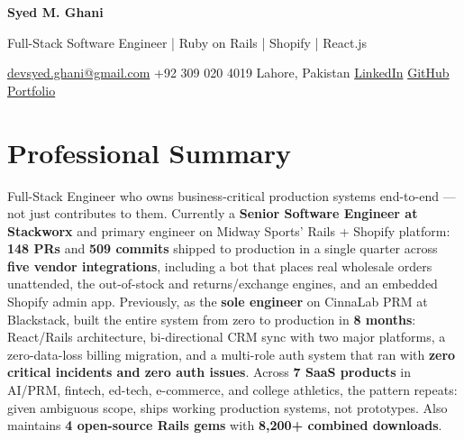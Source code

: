 \documentclass[10pt,a4paper]{article}
\newcommand{\name}[1]{{\fontsize{22pt}{26pt}\selectfont\bfseries\color{headerblue}#1}}
\newcommand{\subtitle}[1]{{\small\color{accent}#1}}
\newcommand{\metric}[1]{{\bfseries\color{accent}#1}}
\newcommand{\win}[1]{{\bfseries\color{green}#1}}
\begin{document}

\name{Syed M. Ghani}

\subtitle{Full-Stack Software Engineer | Ruby on Rails | Shopify | React.js}

\vspace{1pt}
{\small\color{subtle}
  \href{mailto:devsyed.ghani@gmail.com}{devsyed.ghani@gmail.com}
  \enspace\textbullet\enspace +92 309 020 4019
  \enspace\textbullet\enspace Lahore, Pakistan
  \enspace\textbullet\enspace
  \href{https://linkedin.com/in/syedmghani}{LinkedIn}
  \enspace\textbullet\enspace
  \href{https://github.com/dev-syedghani}{GitHub}
  \enspace\textbullet\enspace
  \href{https://syedghani.is-a.dev}{Portfolio}
}

\vspace{1pt}

\section{Professional Summary}

Full-Stack Engineer who owns business-critical production systems end-to-end — not just contributes to them.
Currently a \textbf{Senior Software Engineer at Stackworx} and primary engineer on Midway Sports' Rails + Shopify
platform: \metric{148 PRs} and \metric{509 commits} shipped to production in a single quarter across
\metric{five vendor integrations}, including a bot that places real wholesale orders unattended, the out-of-stock and
returns/exchange engines, and an embedded Shopify admin app. Previously, as the \textbf{sole engineer} on CinnaLab PRM
at Blackstack, built the entire system from zero to production in \metric{8 months}: React/Rails architecture,
bi-directional CRM sync with two major platforms, a zero-data-loss billing migration, and a multi-role auth system that
ran with \win{zero critical incidents and zero auth issues}. Across \metric{7 SaaS products} in AI/PRM, fintech,
ed-tech, e-commerce, and college athletics, the pattern repeats: given ambiguous scope, ships working production
systems, not prototypes. Also maintains \metric{4 open-source Rails gems} with \metric{8,200+ combined downloads}.

\end{document}
